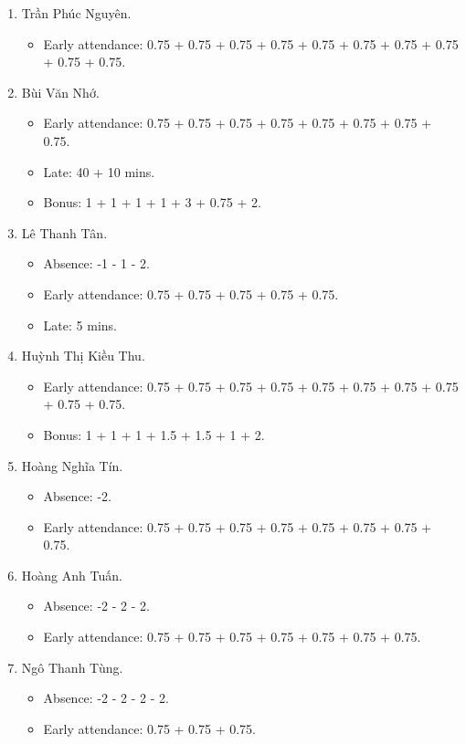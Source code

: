 \documentclass{article}
\begin{document}
\begin{enumerate}
	\item {\sc Trần Phúc Nguyên.}
	\begin{itemize}
		\item Early attendance: 0.75 + 0.75 + 0.75 + 0.75 + 0.75 + 0.75 + 0.75 + 0.75 + 0.75 + 0.75.
	\end{itemize}
	\item {\sc Bùi Văn Nhớ.}
	\begin{itemize}
		\item Early attendance: 0.75 + 0.75 + 0.75 + 0.75 + 0.75 + 0.75 + 0.75 + 0.75.
		\item Late: 40 + 10 mins.
		\item Bonus: 1 + 1 + 1 + 1 + 3 + 0.75 + 2.
	\end{itemize}
	\item {\sc Lê Thanh Tân.}
	\begin{itemize}
		\item Absence: -1 - 1 - 2.
		\item Early attendance: 0.75 + 0.75 + 0.75 + 0.75 + 0.75.
		\item Late: 5 mins.
	\end{itemize}
	\item {\sc Huỳnh Thị Kiều Thu.}
	\begin{itemize}
		\item Early attendance: 0.75 + 0.75 + 0.75 + 0.75 + 0.75 + 0.75 + 0.75 + 0.75 + 0.75 + 0.75.
		\item Bonus: 1 + 1 + 1 + 1.5 + 1.5 + 1 + 2.
	\end{itemize}
	\item {\sc Hoàng Nghĩa Tín.}
	\begin{itemize}
        \item Absence: -2.
		\item Early attendance: 0.75 + 0.75 + 0.75 + 0.75 + 0.75 + 0.75 + 0.75 + 0.75.
	\end{itemize}
	\item {\sc Hoàng Anh Tuấn.}
	\begin{itemize}
		\item Absence: -2 - 2 - 2.
		\item Early attendance: 0.75 + 0.75 + 0.75 + 0.75 + 0.75 + 0.75 + 0.75.
	\end{itemize}
	\item {\sc Ngô Thanh Tùng.}
	\begin{itemize}
		\item Absence: -2 - 2 - 2 - 2.
		\item Early attendance: 0.75 + 0.75 + 0.75.

\end{itemize}
\end{enumerate}
\end{document}
